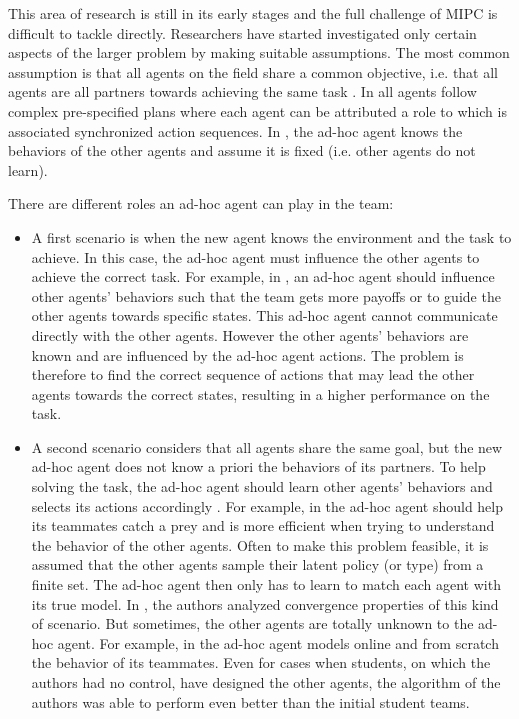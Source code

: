 This area of research is still in its early stages and the full challenge of MIPC is difficult to tackle directly. Researchers have started investigated only certain aspects of the larger problem by making suitable assumptions. The most common assumption is that all agents on the field share a common objective, i.e. that all agents are all partners towards achieving the same task \cite{barrett2011empirical}. In \cite{bowling2005coordination,gil2006dynamically} all agents follow complex pre-specified plans where each agent can be attributed a role to which is associated synchronized action sequences. In \cite{stone2010teach,stone2013teaching}, the ad-hoc agent knows the behaviors of the other agents and assume it is fixed (i.e. other agents do not learn). 

There are different roles an ad-hoc agent can play in the team:

\begin{itemize}

\item A first scenario is when the new agent knows the environment and the task to achieve. In this case, the ad-hoc agent must influence the other agents to achieve the correct task. For example, in  \cite{stone2010teach,stone2013teaching}, an ad-hoc agent should influence other agents' behaviors such that the team gets more payoffs or to guide the other agents towards specific states. This ad-hoc agent cannot communicate directly with the other agents. However the other agents' behaviors are known and are influenced by the ad-hoc agent actions. The problem is therefore to find the correct sequence of actions that may lead the other agents towards the correct states, resulting in a higher performance on the task. 

\item A second scenario considers that all agents share the same goal, but the new ad-hoc agent does not know a priori the behaviors of its partners. To help solving the task, the ad-hoc agent should learn other agents' behaviors and selects its actions accordingly  \cite{barrett2011adhoc,barrett2011empirical,barrett2013team}. For example, in \cite{barrett2011empirical} the ad-hoc agent should help its teammates catch a prey and is more efficient when trying to understand the behavior of the other agents. Often to make this problem feasible, it is assumed that the other agents sample their latent policy (or type) from a finite set. The ad-hoc agent then only has to learn to match each agent with its true model. In \cite{albrecht2014uai}, the authors analyzed convergence properties of this kind of scenario. But sometimes, the other agents are totally unknown to the ad-hoc agent. For example, in \cite{barrett2011empirical} the ad-hoc agent models online and from scratch the behavior of its teammates. Even for cases when students, on which the authors had no control, have designed the other agents, the algorithm of the authors was able to perform even better than the initial student teams.

\end{itemize}

